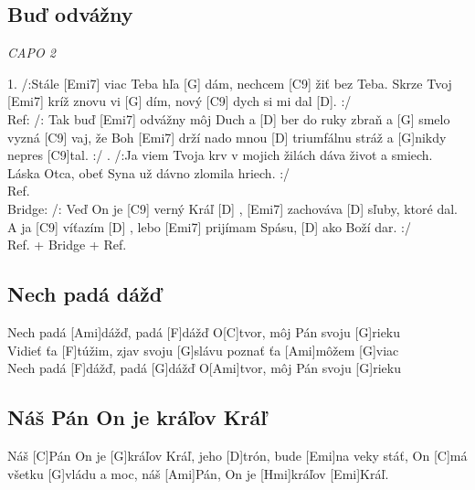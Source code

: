 \documentclass[10pt]{article}
\begin{document}
\begin{Large}
\begin{minipage}{\textwidth}
\subsection{Buď odvážny}
\textit{CAPO 2}
\begin{multicols}{2}
\begin{guitar}
	1. /:Stále [Emi7] viac Teba hľa [G] dám,
	nechcem [C9] žiť bez Teba.
	Skrze Tvoj [Emi7] kríž znovu vi [G] dím,
	nový [C9] dych si mi dal [D]. :/
	\\
	Ref:
	/: Tak buď [Emi7] odvážny môj Duch
	a [D] ber do ruky zbraň
	a [G] smelo vyzná [C9] vaj,
	že Boh [Emi7] drží nado mnou
	[D] triumfálnu stráž
	a [G]nikdy nepres [C9]tal. :/
	. /:Ja viem Tvoja krv
	v mojich žilách dáva život a smiech.
	Láska Otca, obeť Syna 
	už dávno zlomila hriech. :/
	\\
	Ref.
	\\
	Bridge: /: Veď On je [C9] verný Kráľ [D] ,
	[Emi7] zachováva [D] sľuby, ktoré dal.
	A ja [C9] víťazím [D] ,
	lebo [Emi7] prijímam Spásu, [D] ako Boží dar. :/
	\\
	Ref. + Bridge + Ref.
\end{guitar}
\end{multicols}
\end{minipage}

\begin{minipage}{\textwidth}
\begin{multicols*}{2}
	\subsection{Nech padá dážď}
	\begin{guitar}
		Nech padá [Ami]dážď, padá [F]dážď
		O[C]tvor, môj Pán svoju [G]rieku
		\\
		Vidieť ťa [F]túžim, zjav svoju [G]slávu
		poznať ťa [Ami]môžem [G]viac
		\\
		Nech padá [F]dážď, padá [G]dážď
		O[Ami]tvor, môj Pán svoju [G]rieku
	\end{guitar}
\columnbreak
\subsection{Náš Pán On je kráľov Kráľ}
\begin{guitar}
	[Emi]Náš [C]Pán On je [G]kráľov Kráľ, 
	jeho [D]trón, bude [Emi]na veky stáť, 
	On [C]má všetku [G]vládu a moc, 
	náš [Ami]Pán, On je [Hmi]kráľov [Emi]Kráľ.
\end{guitar}
\end{multicols*}
\end{minipage}


\end{Large}
\end{document}

